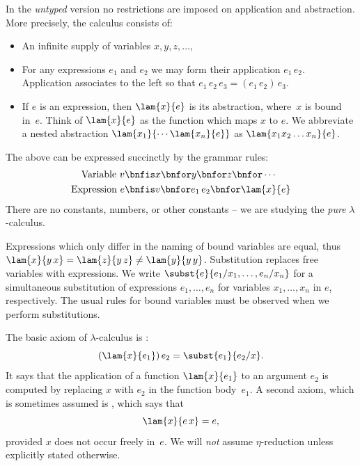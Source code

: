 In the \emph{untyped} version no restrictions are imposed on
application and abstraction. More precisely, the calculus consists of:
%
\begin{itemize}
\item An infinite supply of variables $x, y, z, \ldots$,
\item For any expressions $e_1$ and $e_2$ we may form their
  application $e_1\, e_2$. Application associates to the left so that
  $e_1\, e_2\, e_3 = (e_1\, e_2)\, e_3$.
\item If $e$ is an expression, then $\lam{x}{e}$ is its abstraction,
  where~$x$ is bound in~$e$. Think of $\lam{x}{e}$ as the function
  which maps $x$ to $e$. We abbreviate a nested abstraction
  $\lam{x_1}{\cdots \lam{x_n}{e}}$ as $\lam{x_1 x_2 \ldots x_n}{e}$.
\end{itemize}
%
The above can be expressed succinctly by the grammar rules:
%
\begin{align*}
  \text{Variable}\ v &\bnfis x \bnfor y \bnfor z \bnfor \cdots \\
  \text{Expression}\ e &\bnfis v \bnfor e_1\,e_2 \bnfor \lam{x}{e}
\end{align*}
%
There are no constants, numbers, or other constants -- we are studying the \emph{pure} $\lambda$-calculus.

Expressions which only differ in the naming of bound variables are
equal, thus $\lam{x}{y\, x} = \lam{z}{y\, z} \neq \lam{y}{y\,
  y}$. Substitution replaces free variables with expressions. We write
$\subst{e}{e_1/x_1, \ldots, e_n/x_n}$ for a
simultaneous substitution of expressions $e_1, \ldots, e_n$ for
variables $x_1, \ldots, x_n$ in $e$, respectively. The usual rules for
bound variables must be observed when we perform
substitutions.

The basic axiom of $\lambda$-calculus is :
%
\begin{equation*}
  (\lam{x}{e_1})\, e_2 = \subst{e_1}{e_2/x}.
\end{equation*}
%
It says that the application of a function $\lam{x}{e_1}$ to an
argument $e_2$ is computed by replacing $x$ with $e_2$ in the function
body~$e_1$. A second axiom, which is sometimes assumed is
, which says that
%
\begin{equation*}
  \lam{x}{e\, x} = e,
\end{equation*}
%
provided $x$ does not occur freely in~$e$. We will \emph{not} assume
$\eta$-reduction unless explicitly stated otherwise.

